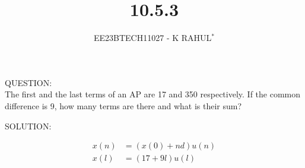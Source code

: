 \documentclass[journal,12pt,twocolumn]{IEEEtran}
\theoremstyle{remark}
\begin{document}

\vspace{3cm}
\title{10.5.3}
\author{EE23BTECH11027 - K RAHUL$^{*}$%
}
\maketitle
\newpage
\bigskip
\renewcommand{\thefigure}{\theenumi}
\renewcommand{\thetable}{\theenumi}
QUESTION:\\
The first and the last terms of an AP are 17 and 350 respectively. If the common difference
is 9, how many terms are there and what is their sum?\\
\bigskip \bigskip


SOLUTION:
\fi
\begin{table}[ht]

\end{table}
\begin{align}
x(n) &= (x(0) + nd)u(n)\\
x(l)&=(17+9l)u(l)
\end{align}
\end{document}
